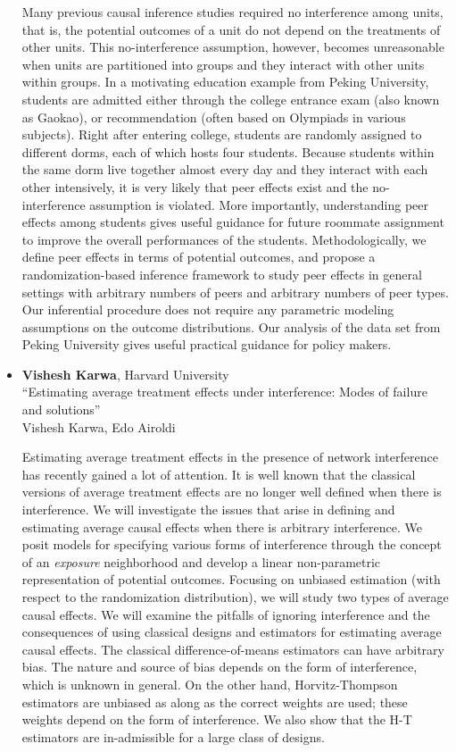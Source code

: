 \begin{itemize}
Many previous causal inference studies required no interference among units, that is, the potential outcomes of a unit do not depend on the treatments of other units. This no-interference assumption, however, becomes unreasonable when units are partitioned into groups and they interact with other units  within groups. In a motivating education example from Peking University, students are admitted either through the college entrance exam (also known as Gaokao), or recommendation (often based on Olympiads in various subjects). Right after entering college, students are randomly assigned to different dorms, each of which hosts four students. Because students within the same dorm live together almost every day and they interact with each other intensively, it is very likely that peer effects exist and the no-interference assumption is violated. More importantly, understanding peer effects among students gives useful guidance for future roommate assignment to improve the overall performances of the students. Methodologically, we define peer effects in terms of potential outcomes, and propose a randomization-based inference framework to study peer effects in general settings with arbitrary numbers of peers and arbitrary numbers of peer types. Our inferential procedure does not require any parametric modeling assumptions on the outcome distributions. Our analysis of the data set from Peking University gives useful practical guidance for policy makers.

\item \textbf{Vishesh Karwa}, Harvard University \\
``Estimating average treatment effects under interference: Modes of failure and solutions'' \\
Vishesh Karwa, Edo Airoldi


Estimating average treatment effects in the presence of network interference has recently gained a lot of attention. It is well known that the classical versions of average treatment effects are no longer well defined when there is interference. We will investigate the issues that arise in defining and estimating average causal effects when there is arbitrary interference. We posit models for specifying various forms of interference through the concept of an \emph{exposure} neighborhood and develop a linear non-parametric representation of potential outcomes. Focusing on unbiased estimation (with respect to the randomization distribution), we will study two types of average causal effects. We will examine the pitfalls of ignoring interference and the consequences of using classical designs and estimators for estimating average causal effects. The classical difference-of-means estimators can have arbitrary bias. The nature and source of bias depends on the form of interference, which is unknown in general. On the other hand, Horvitz-Thompson estimators are unbiased as along as the correct weights are used; these weights depend on the form of interference. We also show that the H-T estimators are in-admissible for a large class of designs.

\end{itemize}

